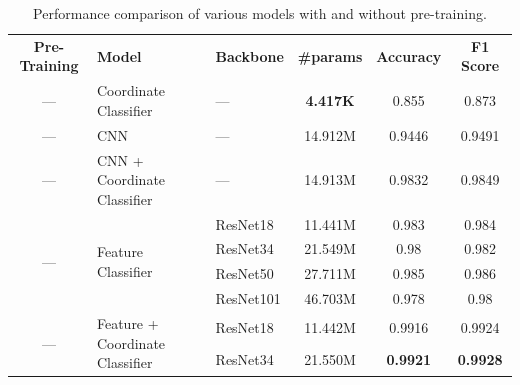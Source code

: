 \documentclass{article}
\begin{document}
\begin{table}[!htp]\centering

  \caption{Performance comparison of various models with and without pre-training.}\label{tab:global_results}
  \scriptsize
  \begin{tabular}{cllccc}\toprule
    \textbf{Pre-Training}             & \textbf{Model}                                   & \textbf{Backbone}           & \textbf{\#params} & \textbf{Accuracy} & \textbf{F1 Score} \\ \cmidrule{1-6}
    ---                               & Coordinate Classifier                            & ---                         & \textbf{4.417K}   & 0.855             & 0.873             \\ \cmidrule{1-6}
    ---                               & CNN                                              & ---                         & 14.912M           & 0.9446            & 0.9491            \\ \cmidrule{1-6}
    ---                               & CNN + Coordinate Classifier                      & ---                         & 14.913M           & 0.9832            & 0.9849            \\ \cmidrule{1-6}
    \multirow{4}{*}{---}              & \multirow{4}{*}{Feature Classifier}              & ResNet18                    & 11.441M           & 0.983             & 0.984             \\
                                      &                                                  & ResNet34                    & 21.549M           & 0.98              & 0.982             \\
                                      &                                                  & ResNet50                    & 27.711M           & 0.985             & 0.986             \\
                                      &                                                  & ResNet101                   & 46.703M           & 0.978             & 0.98              \\ \cmidrule{1-6}
    \multirow{4}{*}{---}              & \multirow{4}{*}{Feature + Coordinate Classifier} & ResNet18                    & 11.442M           & 0.9916            & 0.9924            \\
                                      &                                                  & ResNet34                    & 21.550M           & \textbf{0.9921}   & \textbf{0.9928}   \\

\end{tabular}
\end{table}
\end{document}
